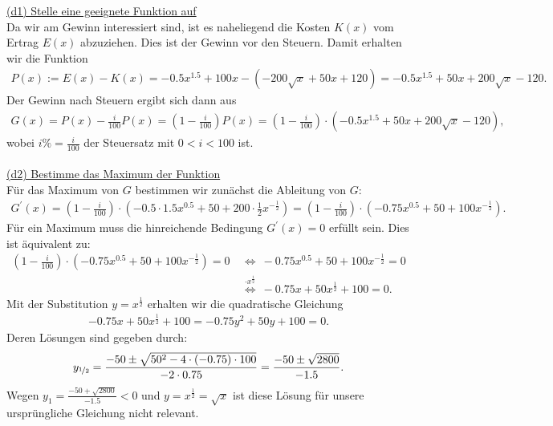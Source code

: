 \underline{(d1) Stelle eine geeignete Funktion auf}\\
Da wir am Gewinn interessiert sind, ist es naheliegend die Kosten $ K(x) $ vom Ertrag $ E(x) $ abzuziehen. Dies ist der Gewinn vor den Steuern.
Damit erhalten wir die Funktion
\begin{align*}
	P(x) := E(x) - K(x)
	=
	-0.5x^{1.5} + 100 x- (-200\sqrt{x} + 50 x +120)
	=
	-0.5x^{1.5} + 50 x + 200 \sqrt{x} -120.
\end{align*}
Der Gewinn nach Steuern ergibt sich dann aus
\begin{align*}
	G(x) = P(x) - \frac{i}{100} P(x)
	=
	\left(1- \frac{i}{100}\right)P(x)
	=
	\left(1- \frac{i}{100}\right) \cdot (-0.5x^{1.5} + 50 x + 200 \sqrt{x} -120),
\end{align*}
wobei $ i \% = \frac{i}{100}$ der Steuersatz mit $ 0 < i < 100 $ ist.\\
\\
\underline{(d2) Bestimme das Maximum der Funktion}\\
Für das Maximum von $ G $ bestimmen wir zunächst die Ableitung von $ G $:
\begin{align*}
	G^\prime(x)
	= \left(1 - \frac{i}{100}\right)
	\cdot \left(-0.5 \cdot 1.5 x^{0.5} + 50 + 200 \cdot \frac{1}{2} x^{- \frac{1}{2}} \right)
	=
	\left(1 - \frac{i}{100}\right)
	\cdot \left(-0.75 x^{0.5} + 50 + 100 x^{- \frac{1}{2}} \right).
\end{align*}
Für ein Maximum muss die hinreichende Bedingung $ G^\prime(x) = 0 $ erfüllt sein.
Dies ist äquivalent zu:
\begin{align*}
	\left(1 - \frac{i}{100}\right)
	\cdot \left(-0.75 x^{0.5} + 50 + 100 x^{- \frac{1}{2}} \right) = 0
	\ &\Leftrightarrow \
	-0.75 x^{0.5} + 50 + 100 x^{- \frac{1}{2}}  = 0\\
	\ &\overset{\cdot x^{\frac{1}{2}}}{\Leftrightarrow}\
	-0.75 x + 50 x^{\frac{1}{2}} + 100   = 0.
\end{align*}
Mit der Substitution $ y = x^{\frac{1}{2}} $ erhalten wir die quadratische Gleichung
\begin{align*}
	-0.75 x + 50 x^{\frac{1}{2}} + 100 
	=
	-0.75 y^2 + 50 y + 100 = 0.
\end{align*}
Deren Lösungen sind gegeben durch:
\begin{align*}
	y_{\nicefrac{1}{2}}
	=
	\frac{-50 \pm \sqrt{50^2 - 4 \cdot (-0.75) \cdot 100}}{-2 \cdot 0.75}
	= 
	\frac{-50 \pm \sqrt{2800}}{-1.5}.
\end{align*}
Wegen $ y_1 = \frac{-50 + \sqrt{2800}}{-1.5}  < 0 $ und $ y = x^{\frac{1}{2}} =  \sqrt{x} $ ist diese Lösung für unsere ursprüngliche Gleichung nicht relevant.
